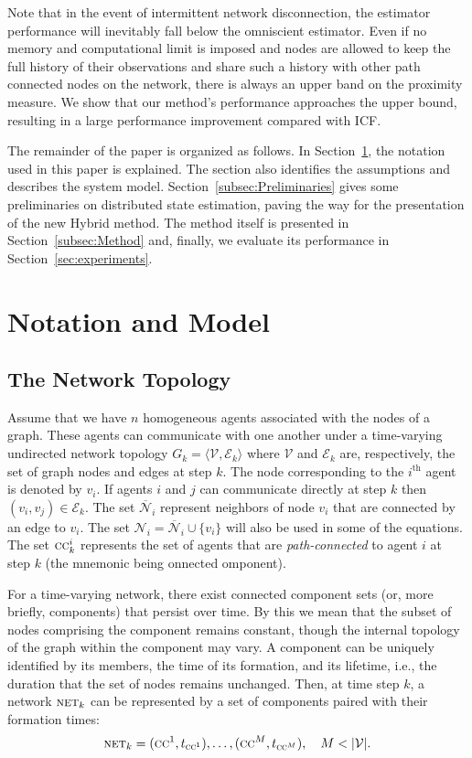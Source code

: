 \documentclass[journal]{IEEEtran}
\newcommand{\net}{\ensuremath{\textsc{net}}}
\theoremstyle{remark}
\theoremstyle{definition}
\begin{document}
Note that in the event of intermittent network disconnection, the estimator
performance will inevitably fall below the omniscient estimator. Even if no
memory and computational limit is imposed and nodes are allowed to keep the
full history of their observations and share such a history with other path
connected nodes on the network, there is always an upper band on the proximity
measure. We show that our method's performance approaches the upper bound,
resulting in a large performance improvement compared with ICF.  

The remainder of the paper is organized as follows.  In
Section~\ref{subsec:assump_not}, the notation used in this paper is explained.
The section also identifies the assumptions and describes the system model.
Section~\ref{subsec:Preliminaries} gives some preliminaries on distributed
state estimation, paving the way for the presentation of the new Hybrid method.
The method itself is presented in Section~\ref{subsec:Method} and, finally, we
evaluate its performance in Section~\ref{sec:experiments}.   

\section{Notation and Model} \label{subsec:assump_not}

\subsection{The Network Topology} 

Assume that we have $n$ homogeneous agents associated with the nodes of a 
graph. These agents can communicate with one another under a time-varying 
undirected network topology $ G_{k} = \langle \mathcal{V},\mathcal{E}_k\rangle 
$ where $\mathcal{V}$ and $\mathcal{E}_k$ are, respectively, the set of graph nodes and edges 
at step $k$. The node corresponding to the $i^\text{th}$ agent is 
denoted by $v_i$. 
If agents $i$ and 
$j$ can communicate directly at step $k$ then
$(v_i,v_j)\in \mathcal{E}_k$. 
The set $\overline{\mathcal{N}}_i$ 
represent 
neighbors of node ${v}_i$ that are connected by an edge to $v_i$. The set 
$\mathcal{N}_i=\overline{\mathcal{N}}_i\cup \{v_i\}$ will also be used in some 
of the equations. The set $\textsc{cc}_k^i$ represents the set of agents 
that are \textit{path-connected} to agent $i$ at step $k$ (the mnemonic being \underline{}onnected \underline{}omponent).

For a time-varying network, there exist connected component sets (or, more briefly, components) that persist over time. 
By this we mean that the subset of nodes comprising the component remains constant, though the internal topology of the graph within the component may vary. 
A component can be uniquely identified by its members, the time of its formation, and its lifetime, i.e., the duration that the set of nodes remains unchanged. Then, at time step $k$, a network $\net_k$ can be represented by a set of components paired with their formation times:
\begin{equation}
	\net_k = {(\textsc{cc}^1,t_{\textsc{cc}^1}), \dots, (\textsc{cc}^M,t_{\textsc{cc}^M})},\quad M<|\mathcal{V}|.
\end{equation}
\end{document}
